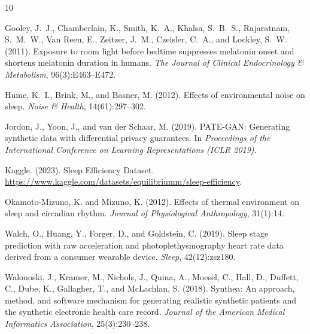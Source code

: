 \documentclass[11pt,a4paper,twocolumn]{article}
\begin{document}

\begin{thebibliography}{10}

Gooley, J.~J., Chamberlain, K., Smith, K.~A., Khalsa, S.~B.~S., Rajaratnam,
S.~M.~W., Van Reen, E., Zeitzer, J.~M., Czeisler, C.~A., and Lockley, S.~W.
(2011).
Exposure to room light before bedtime suppresses melatonin onset and shortens
melatonin duration in humans.
\textit{The Journal of Clinical Endocrinology \& Metabolism}, 96(3):E463--E472.

Hume, K.~I., Brink, M., and Basner, M. (2012).
Effects of environmental noise on sleep.
\textit{Noise \& Health}, 14(61):297--302.

Jordon, J., Yoon, J., and van der Schaar, M. (2019).
PATE-GAN: Generating synthetic data with differential privacy guarantees.
In \textit{Proceedings of the International Conference on Learning
Representations (ICLR 2019)}.

Kaggle. (2023).
Sleep Efficiency Dataset.
\url{https://www.kaggle.com/datasets/equilibriumm/sleep-efficiency}.

Okamoto-Mizuno, K. and Mizuno, K. (2012).
Effects of thermal environment on sleep and circadian rhythm.
\textit{Journal of Physiological Anthropology}, 31(1):14.

Walch, O., Huang, Y., Forger, D., and Goldstein, C. (2019).
Sleep stage prediction with raw acceleration and photoplethysmography heart
rate data derived from a consumer wearable device.
\textit{Sleep}, 42(12):zsz180.

Walonoski, J., Kramer, M., Nichols, J., Quina, A., Moesel, C., Hall, D.,
Duffett, C., Dube, K., Gallagher, T., and McLachlan, S. (2018).
Synthea: An approach, method, and software mechanism for generating realistic
synthetic patients and the synthetic electronic health care record.
\textit{Journal of the American Medical Informatics Association},
25(3):230--238.

\end{thebibliography}
\end{document}
